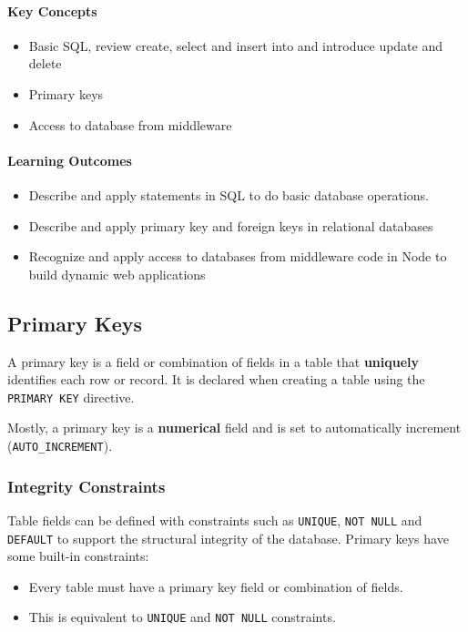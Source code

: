 \begin{mdframed}

\paragraph{Key Concepts}
\begin{itemize}[label={\checkmark}]
\item Basic SQL, review create, select and insert into and introduce update and delete
\item Primary keys
\item Access to database from middleware

\end{itemize}

\paragraph{Learning Outcomes}
\begin{itemize}[label={\checkmark}]
\item Describe and apply statements in SQL to do basic database operations. 
\item Describe and apply primary key and foreign keys in relational databases
\item Recognize and apply access to databases from middleware code in Node to build dynamic web applications

\end{itemize}
\end{mdframed}

\subsection{Primary Keys}
A primary key is a field or combination of fields in a table that \textbf{uniquely} identifies each row or record. It is declared when creating a table using the \texttt{PRIMARY KEY} directive.

Mostly, a primary key is a \textbf{numerical} field and is set to automatically increment (\texttt{AUTO\_INCREMENT}).

\subsubsection{Integrity Constraints}
Table fields can be defined with constraints such as \texttt{UNIQUE}, \texttt{NOT NULL} and  \texttt{DEFAULT} to support the structural integrity of the database. Primary keys have some built-in constraints:
\begin{itemize}
	\item Every table must have a primary key field or combination of fields.
	\item This is equivalent to \texttt{UNIQUE} and \texttt{NOT NULL} constraints.
\end{itemize}

